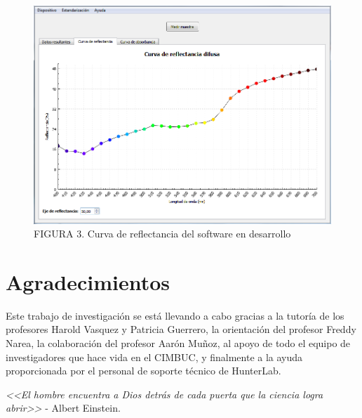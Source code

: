 \documentclass[conference]{IEEEtran}
\begin{document}
		\begin{figure}[H]
			\centering
			\label{figura_3}
			\includegraphics[scale=0.37]{img/nuevoSoftware2}
			\caption{FIGURA 3. Curva de reflectancia del software en desarrollo}
		\end{figure}

\section*{Agradecimientos}
	Este trabajo de investigaci\'{o}n se est\'{a} llevando a cabo gracias a la tutor\'{i}a de los profesores Harold Vasquez y Patricia \mbox{Guerrero}, la orientaci\'{o}n del profesor Freddy Narea, la colaboraci\'{o}n del profesor Aar\'{o}n Mu\~{n}oz, al apoyo de todo el equipo de investigadores que hace vida en el CIMBUC, y finalmente a la ayuda proporcionada por el personal de soporte t\'{e}cnico de HunterLab.
	
	\textit{<<El hombre encuentra a Dios detr\'{a}s de cada puerta que la ciencia logra abrir>>} - Albert Einstein.


\end{document}
